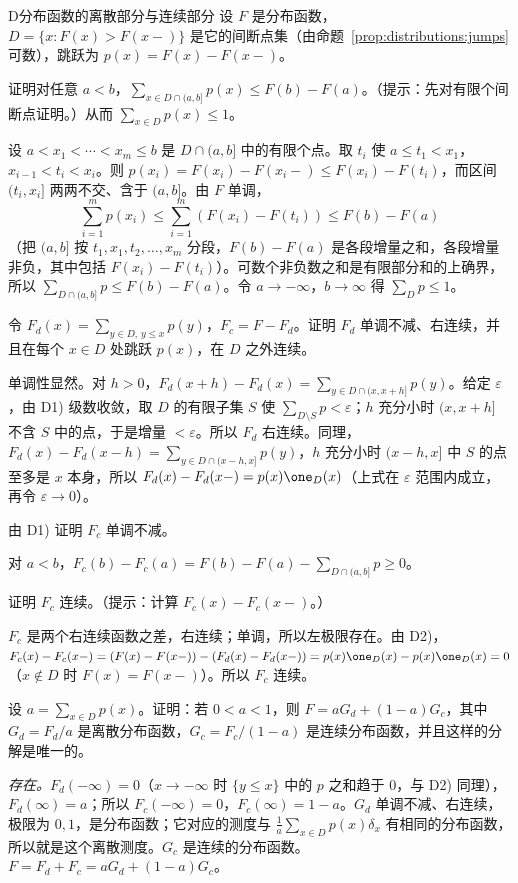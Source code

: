 \begin{probleme}{D}{分布函数的离散部分与连续部分}
设 $F$ 是分布函数，$D=\{x:F(x)>F(x-)\}$ 是它的间断点集（由命题~\ref{prop:distributions:jumps} 可数），跳跃为 $p(x)=F(x)-F(x-)$。
\begin{questions}
\item 证明对任意 $a<b$，$\sum_{x\in D\cap(a,b]}p(x)\leqslant F(b)-F(a)$。（提示：先对有限个间断点证明。）从而 $\sum_{x\in D}p(x)\leqslant1$。
\begin{solution}
设 $a<x_1<\cdots<x_m\leqslant b$ 是 $D\cap(a,b]$ 中的有限个点。取 $t_i$ 使 $a\leqslant t_1<x_1$，$x_{i-1}<t_i<x_i$。则 $p(x_i)=F(x_i)-F(x_i-)\leqslant F(x_i)-F(t_i)$，而区间 $(t_i,x_i]$ 两两不交、含于 $(a,b]$。由 $F$ 单调，
\[
\sum_{i=1}^mp(x_i)\leqslant\sum_{i=1}^m(F(x_i)-F(t_i))\leqslant F(b)-F(a)
\]
（把 $(a,b]$ 按 $t_1,x_1,t_2,\dots,x_m$ 分段，$F(b)-F(a)$ 是各段增量之和，各段增量非负，其中包括 $F(x_i)-F(t_i)$）。可数个非负数之和是有限部分和的上确界，所以 $\sum_{D\cap(a,b]}p\leqslant F(b)-F(a)$。令 $a\to-\infty$，$b\to\infty$ 得 $\sum_Dp\leqslant1$。
\end{solution}
\item 令 $F_d(x)=\sum_{y\in D,\,y\leqslant x}p(y)$，$F_c=F-F_d$。证明 $F_d$ 单调不减、右连续，并且在每个 $x\in D$ 处跳跃 $p(x)$，在 $D$ 之外连续。
\begin{solution}
单调性显然。对 $h>0$，$F_d(x+h)-F_d(x)=\sum_{y\in D\cap(x,x+h]}p(y)$。给定 $\varepsilon$，由 D1) 级数收敛，取 $D$ 的有限子集 $S$ 使 $\sum_{D\setminus S}p<\varepsilon$；$h$ 充分小时 $(x,x+h]$ 不含 $S$ 中的点，于是增量 $<\varepsilon$。所以 $F_d$ 右连续。同理，$F_d(x)-F_d(x-h)=\sum_{y\in D\cap(x-h,x]}p(y)$，$h$ 充分小时 $(x-h,x]$ 中 $S$ 的点至多是 $x$ 本身，所以 $F_d(x)-F_d(x-)=p(x)\one_D(x)$（上式在 $\varepsilon$ 范围内成立，再令 $\varepsilon\to0$）。
\end{solution}
\item 由 D1) 证明 $F_c$ 单调不减。
\begin{solution}
对 $a<b$，$F_c(b)-F_c(a)=F(b)-F(a)-\sum_{D\cap(a,b]}p\geqslant0$。
\end{solution}
\item 证明 $F_c$ 连续。（提示：计算 $F_c(x)-F_c(x-)$。）
\begin{solution}
$F_c$ 是两个右连续函数之差，右连续；单调，所以左极限存在。由 D2)，$F_c(x)-F_c(x-)=(F(x)-F(x-))-(F_d(x)-F_d(x-))=p(x)\one_D(x)-p(x)\one_D(x)=0$（$x\notin D$ 时 $F(x)=F(x-)$）。所以 $F_c$ 连续。
\end{solution}
\item 设 $a=\sum_{x\in D}p(x)$。证明：若 $0<a<1$，则 $F=aG_d+(1-a)G_c$，其中 $G_d=F_d/a$ 是离散分布函数，$G_c=F_c/(1-a)$ 是连续分布函数，并且这样的分解是唯一的。
\begin{solution}
\emph{存在。}$F_d(-\infty)=0$（$x\to-\infty$ 时 $\{y\leqslant x\}$ 中的 $p$ 之和趋于 $0$，与 D2) 同理），$F_d(\infty)=a$；所以 $F_c(-\infty)=0$，$F_c(\infty)=1-a$。$G_d$ 单调不减、右连续，极限为 $0,1$，是分布函数；它对应的测度与 $\frac1a\sum_{x\in D}p(x)\delta_x$ 有相同的分布函数，所以就是这个离散测度。$G_c$ 是连续的分布函数。$F=F_d+F_c=aG_d+(1-a)G_c$。


\end{solution}
\end{questions}
\end{probleme}
